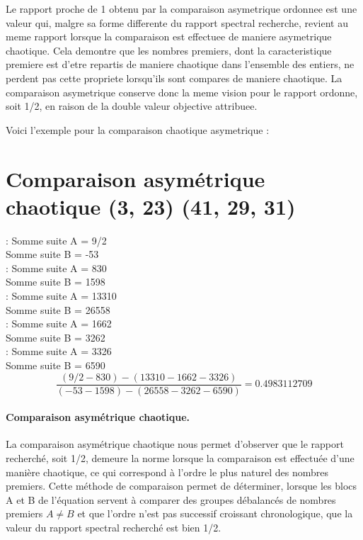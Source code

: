 \documentclass[a4paper,11pt]{article}
\begin{document}
Le rapport proche de 1 obtenu par la comparaison asymetrique ordonnee est une valeur qui, malgre sa forme 
differente du rapport spectral recherche, revient au meme rapport lorsque la comparaison est effectuee de 
maniere asymetrique chaotique. Cela demontre que les nombres premiers, dont la caracteristique premiere est 
d'etre repartis de maniere chaotique dans l'ensemble des entiers, ne perdent pas cette propriete lorsqu'ils 
sont compares de maniere chaotique. La comparaison asymetrique conserve donc la meme vision pour le rapport 
ordonne, soit 1/2, en raison de la double valeur objective attribuee.

Voici l'exemple pour la comparaison chaotique asymetrique :

\section*{Comparaison asymétrique chaotique (3, 23) (41, 29, 31)}

 : Somme suite A = 9/2 \\
\hspace*{1.5em}Somme suite B = -53 \\[1em]

 : Somme suite A = 830 \\
\hspace*{1.5em}Somme suite B = 1598 \\[1em]

 : Somme suite A = 13310 \\
\hspace*{1.5em}Somme suite B = 26558 \\[1em]

 : Somme suite A = 1662 \\
\hspace*{1.5em}Somme suite B = 3262 \\[1em]

 : Somme suite A = 3326 \\
\hspace*{1.5em}Somme suite B = 6590 \\[1em]
\[
\frac{(9/2 - 830) - (13310 - 1662 - 3326)}
     {(-53 - 1598) - (26558 - 3262 - 6590)}
= 0.4983112709
\]

\paragraph{Comparaison asymétrique chaotique.}
La comparaison asymétrique chaotique nous permet d'observer que le rapport recherché, soit 1/2, demeure la norme lorsque la comparaison est effectuée d'une manière chaotique, ce qui correspond à l'ordre le plus naturel des nombres premiers. Cette méthode de comparaison permet de déterminer, lorsque les blocs A et B de l'équation servent à comparer des groupes débalancés de nombres premiers $A \neq B$ et que l'ordre n'est pas successif croissant chronologique, que la valeur du rapport spectral recherché est bien 1/2.
\end{document}
